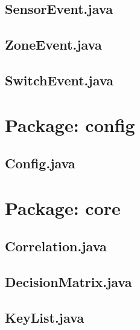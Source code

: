 \subsection{SensorEvent.java}

\subsection{ZoneEvent.java}

\subsection{SwitchEvent.java}



\section{Package: config}
\subsection{Config.java}


\section{Package: core}
\subsection{Correlation.java}

\subsection{DecisionMatrix.java}

\subsection{KeyList.java}


